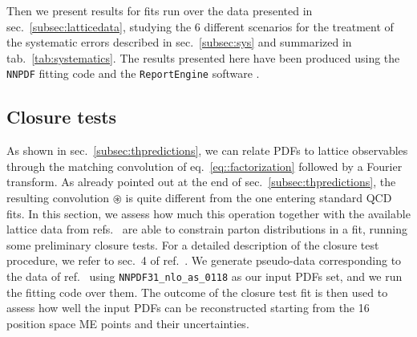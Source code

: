 Then we present results for fits run over the data presented in
sec.~\ref{subsec:latticedata}, studying the 6 different scenarios for the
treatment of the systematic errors described in sec.~\ref{subsec:sys} and
summarized in tab.~\ref{tab:systematics}. 
The results presented here have been produced using the {\tt NNPDF} fitting code \cite{Ball:2017nwa}
and the {\tt ReportEngine} software \cite{zahari_kassabov_2019_2571601}.  

\subsection{Closure tests}
\label{subsec:CT}
As shown in sec.~\ref{subsec:thpredictions}, we can relate PDFs to lattice
observables through the matching convolution of eq.~\eqref{eq::factorization}
followed by a Fourier transform. As already pointed out at the end of
sec.~\ref{subsec:thpredictions}, the resulting convolution $\circledast$ is
quite different from the one entering standard QCD fits. In this section, we
assess how much this operation together with the available lattice data from
refs.~\cite{Alexandrou:2018pbm,Alexandrou:2019lfo} are able to constrain parton distributions in a
fit, running some preliminary closure tests. For a detailed description of the
closure test procedure, we refer to sec.~4 of ref.~\cite{Ball:2014uwa}. We
generate pseudo-data corresponding to the data of ref.~\cite{Alexandrou:2018pbm}
using {\tt NNPDF31\_nlo\_as\_0118} as our input PDFs set, and we run the fitting
code over them. The outcome of the closure test fit is then used to assess how
well the input PDFs can be reconstructed starting from the 16 position space ME
points and their uncertainties.

